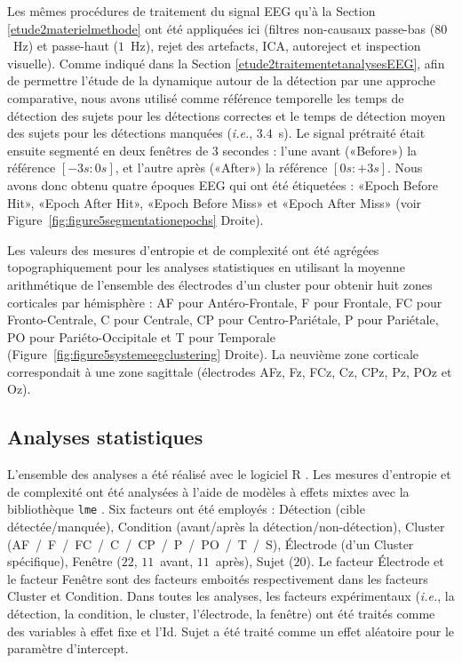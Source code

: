 Les mêmes procédures de traitement du signal EEG qu'à la Section \ref{etude2materielmethode} ont été appliquées ici (filtres non-causaux passe-bas ($80$~Hz) et passe-haut ($1$~Hz), rejet des artefacts, ICA, autoreject et inspection visuelle).
Comme indiqué dans la Section \ref{etude2traitementetanalysesEEG}, afin de permettre l'étude de la dynamique autour de la détection par une approche comparative, nous avons utilisé comme référence temporelle les temps de détection des sujets pour les détections correctes et le temps de détection moyen des sujets pour les détections manquées (\textit{i.e.}, $3.4$~s). 
Le signal prétraité était ensuite segmenté en deux fenêtres de $3$ secondes : l'une avant («Before») la référence $[-3s:0s]$, et l'autre après («After») la référence $[0s:+3s]$. 
Nous avons donc obtenu quatre époques EEG qui ont été étiquetées : «Epoch Before Hit», «Epoch After Hit», «Epoch Before Miss» et «Epoch After Miss» (voir Figure~\ref{fig:figure5segmentationepochs} Droite). 

Les valeurs des mesures d'entropie et de complexité ont été agrégées topographiquement pour les analyses statistiques en utilisant la moyenne arithmétique de l'ensemble des électrodes d'un cluster pour obtenir huit zones corticales par hémisphère \citep{grabner2012oscillatory} : AF pour Antéro-Frontale, F pour Frontale, FC pour Fronto-Centrale, C pour Centrale, CP pour Centro-Pariétale, P pour Pariétale, PO pour Pariéto-Occipitale et T pour Temporale (Figure~\ref{fig:figure5systemeegclustering} Droite). 
La neuvième zone corticale correspondait à une zone sagittale (électrodes AFz, Fz, FCz, Cz, CPz, Pz, POz et Oz). 

\newpage
\subsection{Analyses statistiques}
\label{analysesstatmesuresentropiecomplexite}

L'ensemble des analyses a été réalisé avec le logiciel R \citep{Rlanguage2021}. 
Les mesures d'entropie et de complexité ont été analysées à l'aide de modèles à effets mixtes avec la bibliothèque \texttt{lme} \citep{bates2007lme4}. 
Six facteurs ont été employés : Détection (cible détectée/manquée), Condition (avant/après la détection/non-détection), Cluster (AF~/~F~/~FC~/~C~/~CP~/~P~/~PO~/~T~/~S), Électrode (d'un Cluster spécifique), Fenêtre ($22$, $11$~avant, $11$~après), Sujet ($20$). 
Le facteur Électrode et le facteur Fenêtre sont des facteurs emboités respectivement dans les facteurs Cluster et Condition. 
Dans toutes les analyses, les facteurs expérimentaux (\textit{i.e.}, la détection, la condition, le cluster, l'électrode, la fenêtre) ont été traités comme des variables à effet fixe et l'Id. Sujet a été traité comme un effet aléatoire pour le paramètre d'intercept. 

